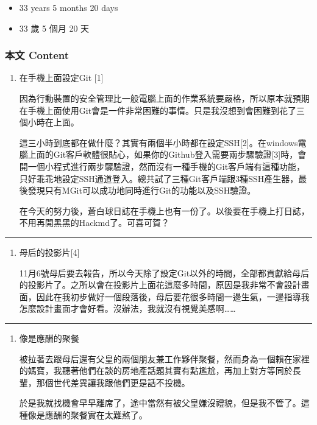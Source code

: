 \documentclass[
]{article}
\providecommand{\tightlist}{%
  \setlength{\itemsep}{0pt}\setlength{\parskip}{0pt}}
\begin{document}
\begin{itemize}
\tightlist
\item
  33 years 5 months 20 days
\item
  33 歲 5 個月 20 天
\end{itemize}

\hypertarget{ux672cux6587-content-14}{%
\subsubsection{本文 Content}\label{ux672cux6587-content-14}}

\begin{enumerate}
\def\labelenumi{\arabic{enumi}.}
\item
  在手機上面設定Git {[}1{]}

  因為行動裝置的安全管理比一般電腦上面的作業系統要嚴格，所以原本就預期在手機上面使用Git會是一件非常困難的事情。只是我沒想到會困難到花了三個小時在上面。

  這三小時到底都在做什麼？其實有兩個半小時都在設定SSH{[}2{]}。在windows電腦上面的Git客戶軟體很貼心，如果你的Github登入需要兩步驟驗證{[}3{]}時，會開一個小程式進行兩步驟驗證，然而沒有一種手機的Git客戶端有這種功能，只好乖乖地設定SSH通道登入。總共試了三種Git客戶端跟3種SSH產生器，最後發現只有MGit可以成功地同時進行Git的功能以及SSH驗證。

  在今天的努力後，蒼白球日誌在手機上也有一份了。以後要在手機上打日誌，不用再開黑黑的Hackmd了。可喜可賀？
\end{enumerate}

\begin{center}\rule{0.5\linewidth}{\linethickness}\end{center}

\begin{enumerate}
\def\labelenumi{\arabic{enumi}.}
\setcounter{enumi}{1}
\item
  母后的投影片{[}4{]}

  11月6號母后要去報告，所以今天除了設定Git以外的時間，全部都貢獻給母后的投影片了。之所以會在投影片上面花這麼多時間，原因是我非常不會設計畫面，因此在我初步做好一個段落後，母后要花很多時間一邊生氣，一邊指導我怎麼設計畫面才會好看。沒辦法，我就沒有視覺美感啊\ldots\ldots{}
\end{enumerate}

\begin{center}\rule{0.5\linewidth}{\linethickness}\end{center}

\begin{enumerate}
\def\labelenumi{\arabic{enumi}.}
\setcounter{enumi}{2}
\item
  像是應酬的聚餐

  被拉著去跟母后還有父皇的兩個朋友兼工作夥伴聚餐，然而身為一個賴在家裡的媽寶，我聽著他們在談的房地產話題其實有點尷尬，再加上對方等同於長輩，那個世代差異讓我跟他們更是話不投機。

  於是我就找機會早早離席了，途中當然有被父皇嫌沒禮貌，但是我不管了。這種像是應酬的聚餐實在太難熬了。
\end{enumerate}
\end{document}
